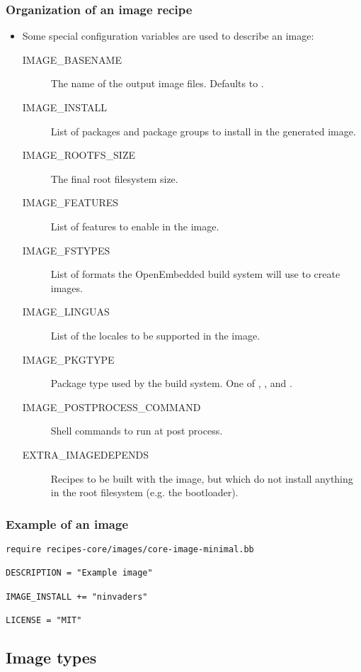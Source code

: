 \begin{frame}
  \frametitle{Organization of an image recipe}
  \begin{itemize}
    \item Some special configuration variables are used to describe an
      image:
      \begin{description}
        \item[IMAGE\_BASENAME] The name of the output image files.
          Defaults to .
        \item[IMAGE\_INSTALL] List of packages and package groups to
          install in the generated image.
        \item[IMAGE\_ROOTFS\_SIZE] The final root filesystem size.
        \item[IMAGE\_FEATURES] List of features to enable in the
          image.
        \item[IMAGE\_FSTYPES] List of formats the OpenEmbedded build
          system will use to create images.
        \item[IMAGE\_LINGUAS] List of the locales to be supported in
          the image.
        \item[IMAGE\_PKGTYPE] Package type used by the build system.
          One of , ,  and .
        \item[IMAGE\_POSTPROCESS\_COMMAND] Shell commands to run at
          post process.
        \item[EXTRA\_IMAGEDEPENDS] Recipes to be built with the image, but
          which do not install anything in the root filesystem
          (e.g. the bootloader).
      \end{description}
  \end{itemize}
\end{frame}

\begin{frame}[fragile]
  \frametitle{Example of an image}
  \begin{block}{}
    \begin{verbatim}
require recipes-core/images/core-image-minimal.bb

DESCRIPTION = "Example image"

IMAGE_INSTALL += "ninvaders"

LICENSE = "MIT"
    \end{verbatim}
  \end{block}
\end{frame}

\subsection{Image types}

